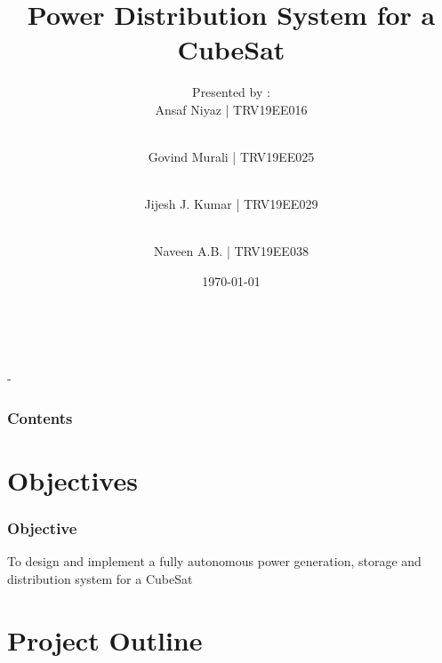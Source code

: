 \documentclass[aspectratio=169]{beamer}
\begin{document}
	\title{Power Distribution System for a CubeSat}
	
	\subtitle{}
     \author{Presented by :\\Ansaf Niyaz | TRV19EE016 \and \\Govind Murali | TRV19EE025  \and\\Jijesh J. Kumar | TRV19EE029  \and \\Naveen A.B. | TRV19EE038}
     
	\date{\today}
	
	
{%
	\hbox{%
		\hbox{\insertslidenavigationsymbol}
		\hbox{\insertframenavigationsymbol}
		\hbox{\insertsubsectionnavigationsymbol}
		\hbox{\insertsectionnavigationsymbol}
		\hbox{\insertdocnavigationsymbol}
		\hbox{\insertbackfindforwardnavigationsymbol}}%
}
	\begin{frame}[plain]
	\maketitle
-\end{frame}


\begin{frame}
\frametitle{Contents}




\tableofcontents
\end{frame}



\section{Objectives}
\begin{frame}
	
\frametitle{Objective}
 To design and implement a fully autonomous power generation, storage and distribution system for a CubeSat 
 
 

\end{frame}




\section{Project Outline}
\end{document}
